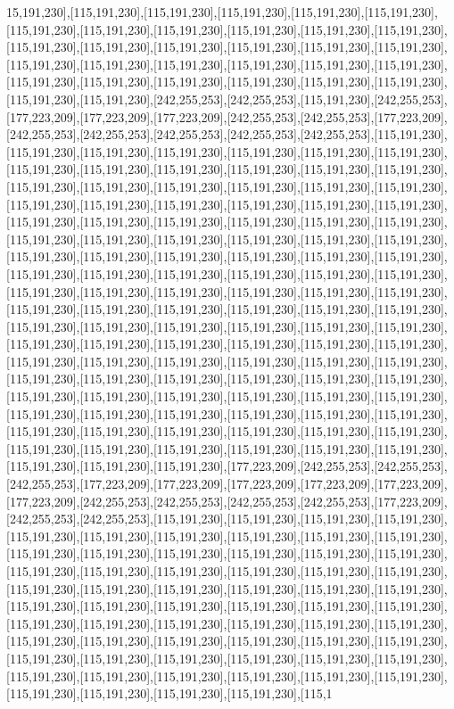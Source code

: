 15,191,230],[115,191,230],[115,191,230],[115,191,230],[115,191,230],[115,191,230],[115,191,230],[115,191,230],[115,191,230],[115,191,230],[115,191,230],[115,191,230],[115,191,230],[115,191,230],[115,191,230],[115,191,230],[115,191,230],[115,191,230],[115,191,230],[115,191,230],[115,191,230],[115,191,230],[115,191,230],[115,191,230],[115,191,230],[115,191,230],[115,191,230],[115,191,230],[115,191,230],[115,191,230],[115,191,230],[115,191,230],[242,255,253],[242,255,253],[115,191,230],[242,255,253],[177,223,209],[177,223,209],[177,223,209],[242,255,253],[242,255,253],[177,223,209],[242,255,253],[242,255,253],[242,255,253],[242,255,253],[242,255,253],[115,191,230],[115,191,230],[115,191,230],[115,191,230],[115,191,230],[115,191,230],[115,191,230],[115,191,230],[115,191,230],[115,191,230],[115,191,230],[115,191,230],[115,191,230],[115,191,230],[115,191,230],[115,191,230],[115,191,230],[115,191,230],[115,191,230],[115,191,230],[115,191,230],[115,191,230],[115,191,230],[115,191,230],[115,191,230],[115,191,230],[115,191,230],[115,191,230],[115,191,230],[115,191,230],[115,191,230],[115,191,230],[115,191,230],[115,191,230],[115,191,230],[115,191,230],[115,191,230],[115,191,230],[115,191,230],[115,191,230],[115,191,230],[115,191,230],[115,191,230],[115,191,230],[115,191,230],[115,191,230],[115,191,230],[115,191,230],[115,191,230],[115,191,230],[115,191,230],[115,191,230],[115,191,230],[115,191,230],[115,191,230],[115,191,230],[115,191,230],[115,191,230],[115,191,230],[115,191,230],[115,191,230],[115,191,230],[115,191,230],[115,191,230],[115,191,230],[115,191,230],[115,191,230],[115,191,230],[115,191,230],[115,191,230],[115,191,230],[115,191,230],[115,191,230],[115,191,230],[115,191,230],[115,191,230],[115,191,230],[115,191,230],[115,191,230],[115,191,230],[115,191,230],[115,191,230],[115,191,230],[115,191,230],[115,191,230],[115,191,230],[115,191,230],[115,191,230],[115,191,230],[115,191,230],[115,191,230],[115,191,230],[115,191,230],[115,191,230],[115,191,230],[115,191,230],[115,191,230],[115,191,230],[115,191,230],[115,191,230],[115,191,230],[115,191,230],[115,191,230],[115,191,230],[115,191,230],[115,191,230],[115,191,230],[115,191,230],[115,191,230],[115,191,230],[115,191,230],[115,191,230],[177,223,209],[242,255,253],[242,255,253],[242,255,253],[177,223,209],[177,223,209],[177,223,209],[177,223,209],[177,223,209],[177,223,209],[242,255,253],[242,255,253],[242,255,253],[242,255,253],[177,223,209],[242,255,253],[242,255,253],[115,191,230],[115,191,230],[115,191,230],[115,191,230],[115,191,230],[115,191,230],[115,191,230],[115,191,230],[115,191,230],[115,191,230],[115,191,230],[115,191,230],[115,191,230],[115,191,230],[115,191,230],[115,191,230],[115,191,230],[115,191,230],[115,191,230],[115,191,230],[115,191,230],[115,191,230],[115,191,230],[115,191,230],[115,191,230],[115,191,230],[115,191,230],[115,191,230],[115,191,230],[115,191,230],[115,191,230],[115,191,230],[115,191,230],[115,191,230],[115,191,230],[115,191,230],[115,191,230],[115,191,230],[115,191,230],[115,191,230],[115,191,230],[115,191,230],[115,191,230],[115,191,230],[115,191,230],[115,191,230],[115,191,230],[115,191,230],[115,191,230],[115,191,230],[115,191,230],[115,191,230],[115,191,230],[115,191,230],[115,191,230],[115,191,230],[115,191,230],[115,191,230],[115,191,230],[115,191,230],[115,191,230],[115,191,230],[115,1